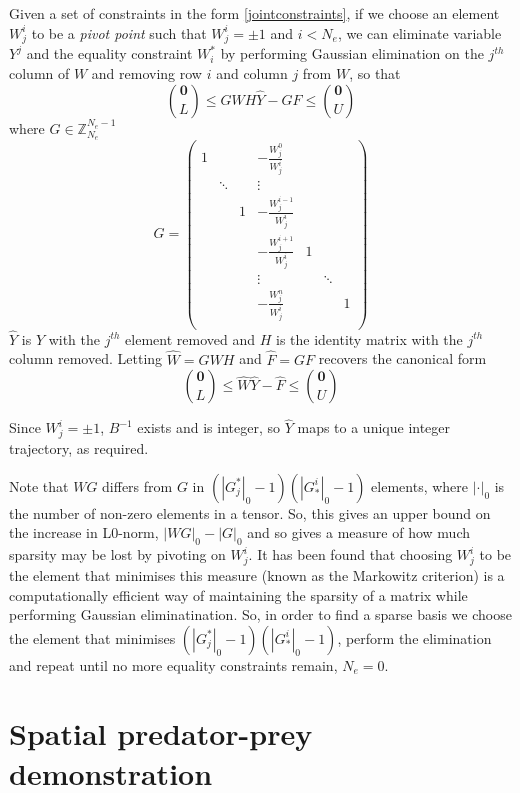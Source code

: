 \documentclass{article}
\begin{document}
Given a set of constraints in the form \eqref{jointconstraints}, if we choose an element $W^i_j$ to be a \textit{pivot point} such that $W^i_j = \pm1$ and $i < N_e$, we can eliminate variable $Y^j$ and the equality constraint $W^*_i$ by performing Gaussian elimination on the $j^{th}$ column of $W$ and removing row $i$ and column $j$ from $W$, so that
\[
{\mathbf{0} \choose L} \le GWH\hat{Y} - GF \le {\mathbf{0} \choose U}
\]
where $G\in \mathbb{Z}^{N_e-1}_{N_e}$
\[
G =  
\begin{pmatrix}
1 &  & &-\frac{W^0_j}{W^i_j} & & &\\
& \ddots & &\vdots & & &\\
& & 1 & -\frac{W^{i-1}_j}{W^i_j} & & &\\
& &  & -\frac{W^{i+1}_j}{W^i_j} & 1 & &\\
& & & \vdots & & \ddots &\\
& & & -\frac{W^n_j}{W^i_j} & & &1\\
\end{pmatrix}
\]
$\hat{Y}$ is $Y$ with the $j^{th}$ element removed and $H$ is the identity matrix with the $j^{th}$ column removed. Letting $\hat{W} = GWH$ and $\hat{F} = GF$ recovers the canonical form
\[
{\mathbf{0} \choose L} \le \hat{W}\hat{Y} - \hat{F} \le {\mathbf{0} \choose U}
\]

Since $W^i_j = \pm1$, $B^{-1}$ exists and is integer, so $\hat{Y}$ maps to a unique integer trajectory, as required.

Note that $WG$ differs from $G$ in $(\left|G^*_j\right|_0-1)(\left|G^i_*\right|_0-1)$ elements, where $\left|\cdot\right|_0$ is the number of non-zero elements in a tensor. So, this gives an upper bound on the increase in L0-norm, $\left|WG\right|_0 - \left|G\right|_0$ and so gives a measure of how much sparsity may be lost by pivoting on $W^i_j$.  It has been found that choosing $W^i_j$ to be the element that minimises this measure (known as the Markowitz criterion) is a computationally efficient way of maintaining the sparsity of a matrix while performing Gaussian eliminatination\cite{markowitz1957elimination}\cite{maros2002computational}\cite{suhl1990computing}. So, in order to find a sparse basis we choose the element that minimises $(\left|G^*_j\right|_0-1)(\left|G^i_*\right|_0-1)$, perform the elimination and repeat until no more equality constraints remain, $N_e=0$.

\section{Spatial predator-prey demonstration}
\end{document}
